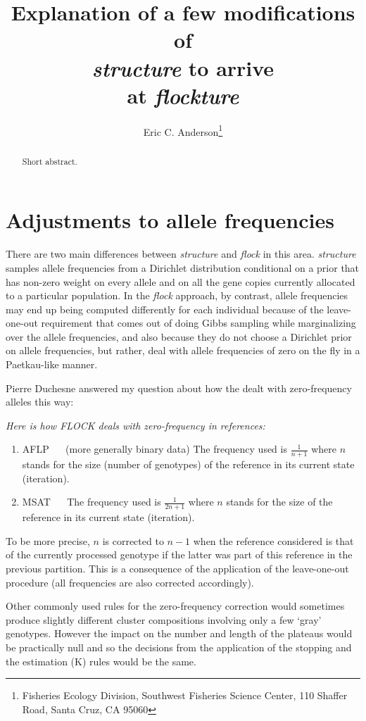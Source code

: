 \documentclass[11pt]{article}
\title{Explanation of a few modifications of\\
{\em structure} to arrive \\
 at {\em flockture}}
\author{Eric C. Anderson\thanks{
    Fisheries Ecology Division, 
    Southwest Fisheries Science Center, 
    110 Shaffer Road,
    Santa Cruz, CA 95060}
}
\begin{document}
\maketitle

\begin{abstract}
Short abstract.
\end{abstract}




\section{Adjustments to allele frequencies}

There are two main differences between {\em structure} and {\em flock} in this area.
{\em structure} samples allele frequencies from a  Dirichlet distribution conditional on a prior that has non-zero weight on every allele and 
on all the gene copies currently allocated to a particular population.  In the {\em flock} approach, by contrast, 
allele frequencies may end up being computed differently for each individual because of the leave-one-out requirement
that comes out of doing Gibbs sampling while marginalizing over the allele frequencies, and also because they do not 
choose a Dirichlet prior on allele frequencies, but rather, deal with allele frequencies of zero on the fly
in a Paetkau-like manner.

Pierre Duchesne answered my question about how the dealt with zero-frequency alleles this way:

{\sl 
Here is how FLOCK deals with zero-frequency in references:
\begin{enumerate}
\item AFLP ~~ (more generally binary data) The frequency used is $\frac{1}{n+1}$ where $n$ stands for  the size (number of genotypes) of the reference in its current state (iteration).
\item MSAT ~~ The frequency used is $\frac{1}{2n+1}$ where $n$ stands for  the size of the reference in its current state (iteration).
\end{enumerate}
To be more precise, $n$ is corrected to $n-1$ when the reference considered is that of the currently processed
genotype if the latter was part of this reference in the previous partition.
This is a consequence of the application of the leave-one-out procedure 
(all frequencies are also corrected accordingly).
 
Other commonly used rules for the zero-frequency correction would sometimes produce slightly
different cluster compositions involving only a few `gray' genotypes.
However the impact on the number and length of the plateaus would be practically null
and so the decisions from the application of the stopping and the estimation (K)
rules would be the same.
}
\end{document}
